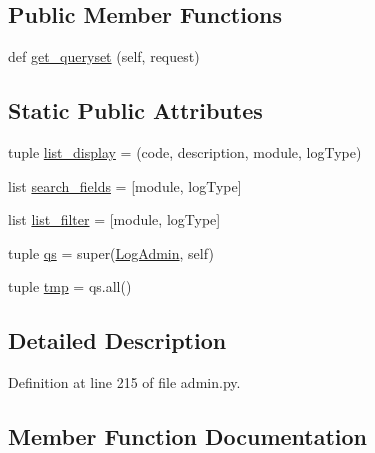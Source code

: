 \subsection*{Public Member Functions}
\begin{DoxyCompactItemize}
\item 
def \hyperlink{class_ground_segment_1_1admin_1_1_log_admin_ab972229da908405f30511b5faecd9c60}{get\+\_\+queryset} (self, request)
\end{DoxyCompactItemize}
\subsection*{Static Public Attributes}
\begin{DoxyCompactItemize}
\item 
tuple \hyperlink{class_ground_segment_1_1admin_1_1_log_admin_ac8c7525189a7e9e57965075df5ec45c7}{list\+\_\+display} = (\textquotesingle{}code\textquotesingle{}, \textquotesingle{}description\textquotesingle{}, \textquotesingle{}module\textquotesingle{}, \textquotesingle{}log\+Type\textquotesingle{})
\item 
list \hyperlink{class_ground_segment_1_1admin_1_1_log_admin_ae4e75207a6f7a882014da7f3fb13e007}{search\+\_\+fields} = \mbox{[}\textquotesingle{}module\textquotesingle{}, \textquotesingle{}log\+Type\textquotesingle{}\mbox{]}
\item 
list \hyperlink{class_ground_segment_1_1admin_1_1_log_admin_af2b67dae38be5b38e45f557981df1d60}{list\+\_\+filter} = \mbox{[}\textquotesingle{}module\textquotesingle{}, \textquotesingle{}log\+Type\textquotesingle{}\mbox{]}
\item 
tuple \hyperlink{class_ground_segment_1_1admin_1_1_log_admin_ab30bff8bf9257f4f38a07a1a0cb2f708}{qs} = super(\hyperlink{class_ground_segment_1_1admin_1_1_log_admin}{Log\+Admin}, self)
\item 
tuple \hyperlink{class_ground_segment_1_1admin_1_1_log_admin_a3446b8c0fd9063654839bc4b13498736}{tmp} = qs.\+all()
\end{DoxyCompactItemize}


\subsection{Detailed Description}


Definition at line 215 of file admin.\+py.



\subsection{Member Function Documentation}
\hypertarget{class_ground_segment_1_1admin_1_1_log_admin_ab972229da908405f30511b5faecd9c60}{}
